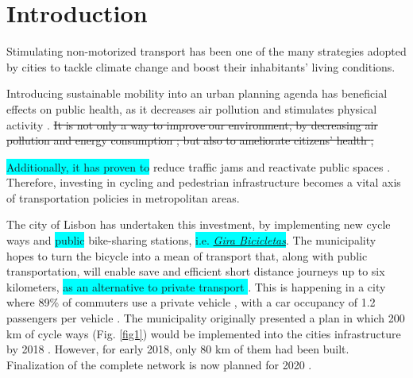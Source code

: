 \documentclass[information,article,submit,moreauthors,Latex,dvi2pdf,10pt,a4paper]{Definitions/mdpi}
\begin{document}


\section{Introduction}

Stimulating non-motorized transport has been one of the many strategies adopted by cities to tackle climate change \cite{Banister2011} and boost their inhabitants' living conditions. 
\begin{mycolorbox}[colback=cyan]
Introducing sustainable mobility into an urban planning agenda has beneficial effects on public health, as it decreases air pollution and stimulates physical activity \cite{Fraser2011,DeHartog2010,Torres2018,Carley2017,Bopp2018}. \sout{It is not only a way to improve our environment, by decreasing air pollution and energy consumption \cite{Fraser2011}; but also to ameliorate citizens' health \cite{DeHartog2010},} 
\end{mycolorbox}
\colorbox{cyan}{Additionally, it has proven to} reduce traffic jams \cite{Kosha2016} and reactivate public spaces \cite{DeManuelJerez2016}. Therefore, investing in cycling and pedestrian infrastructure becomes a vital axis of transportation policies in metropolitan areas.

The city of Lisbon has undertaken this investment, by implementing new cycle ways and \colorbox{cyan}{public} bike-sharing stations, \colorbox{cyan}{i.e. \textit{\href{https://www.gira-bicicletasdelisboa.pt/}{Gira Bicicletas}}}. The municipality hopes to turn the bicycle into a mean of transport that, along with public transportation, will enable save and efficient short distance journeys up to six kilometers, \colorbox{cyan}{as an alternative to private transport \cite{CamaraMunicipaldeLisboa,Marrana2018}}. This is happening in a city where 89\% of commuters use a private vehicle \cite{CamaraMunicipaldeLisboa2016}, with a car occupancy of 1.2 passengers per vehicle \cite{Silva2017}. The municipality originally presented a plan in which 200 km of cycle ways (Fig. \ref{fig1}) would be implemented into the cities infrastructure by 2018 \cite{Susete2016}. However, for early 2018, only 80 km of them had been built. Finalization of the complete network is now planned for 2020 \cite{Andre2018}.
\end{document}

